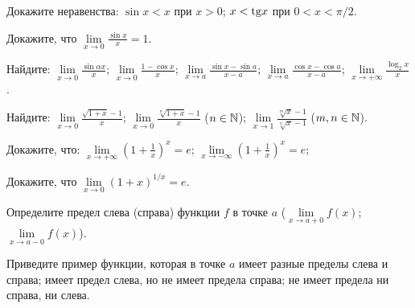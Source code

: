 \documentclass[a4paper, 12pt]{article}
\newcommand{\0}[1]{\overline{#1}}
\begin{document}



Докажите неравенства:
 $\sin x<x$ при $x>0$;
 $x<{\rm tg} x$ при $0<x<\pi/2$.

 Докажите, что
$\lim\limits_{x\to0}\frac{\sin x}x=1$.

 Найдите:
 $\lim\limits_{x\to0}\frac{\sin{\alpha x}}{x}$;
 $\lim\limits_{x\to0}\frac{1-\cos x}x$;
 $\lim\limits_{x\to a}\frac{\sin x-\sin a}{x-a}$;
 $\lim\limits_{x\to a}\frac{\cos x-\cos a}{x-a}$;
 $\lim\limits_{x\to +\infty}\frac{\log_2 x}{x}$.

 Найдите:
 $\lim\limits_{x \to 0} \frac{\sqrt{1+x}-1}x$;
 $\lim\limits_{x \to 0} \frac{\sqrt[n]{1+x}-1}x$ ($n\in \mathbb{N}$);
 $\lim\limits_{x \to 1} \frac{\sqrt[m]{x}-1}{\sqrt[n]{x}-1}$
($m,n\in \mathbb{N}$).

 Докажите, что:
 $\lim\limits_{x \to +\infty} \left(1+\frac1x\right)^x=e$;
 $\lim\limits_{x \to -\infty} \left(1+\frac1x\right)^x=e$;

 Докажите, что
$\lim\limits_{x \to 0} (1+x)^{1/x}=e$.



 Определите предел слева (справа) функции $f$ в точке $a$
($\lim\limits_{x \to a+0} f(x)$; $\lim\limits_{x \to a-0} f(x)$).



 Приведите пример функции, которая в точке $a$
 имеет разные пределы слева и справа;
 имеет предел слева, но не имеет предела справа;
 не имеет предела ни справа, ни слева.
\end{document}
